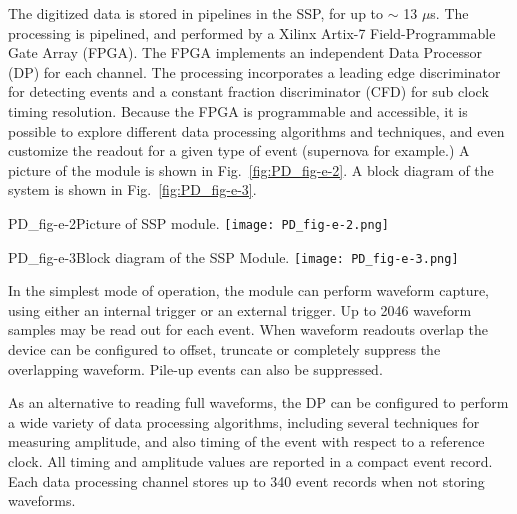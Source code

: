 The digitized data is stored in pipelines in the SSP, for up to $\sim$ 13 $\mu$s.  
The processing is pipelined, and performed by a Xilinx Artix-7 
Field-Programmable Gate Array (FPGA).  
The FPGA implements an independent Data Processor (DP) for each channel.  
The processing incorporates a leading edge discriminator for detecting events
and a constant fraction discriminator (CFD) for sub 
clock timing resolution.  
Because the FPGA is programmable and accessible, it is possible to explore 
different data processing algorithms and techniques, and even customize the 
readout for a given type of event (supernova for example.)  
A picture of the module is shown in Fig.~\ref{fig:PD_fig-e-2}.  
A block diagram of the system is shown in Fig.~\ref{fig:PD_fig-e-3}.
%
\begin{cdrfigure}{PD_fig-e-2}{Picture of SSP module.}
  \texttt{[image: PD\_fig-e-2.png]}
\end{cdrfigure}
%
%
\begin{cdrfigure}{PD_fig-e-3}{Block diagram of the SSP Module.}
  \texttt{[image: PD\_fig-e-3.png]}
\end{cdrfigure}
%
In the simplest mode of operation, the module can perform waveform capture, 
using either an internal trigger or an external trigger.  
Up to 2046 waveform samples may be read out for each event.  When waveform 
readouts overlap the device can be configured to offset, 
truncate or completely suppress the overlapping waveform.  
Pile-up events can also be suppressed.  

As an alternative to reading full waveforms, the DP can be configured to 
perform a wide variety of data processing algorithms, 
including several techniques for measuring amplitude, and also timing of 
the event with respect to a reference clock.  
All timing and amplitude values are reported in a compact event record.  
Each data processing channel stores up to 340 event records when not storing waveforms.  

